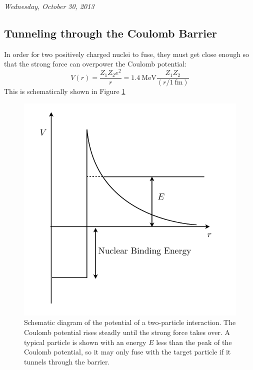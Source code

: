 \documentclass[10pt]{article}
\numberwithin{equation}{section}
\newcommand{\n}{\noindent}
\newcommand{\figref}[1]{Figure \ref{#1}}
\begin{document}
	
	\n \textit{Wednesday, October 30, 2013}
	
  \subsection{Tunneling through the Coulomb Barrier}
  \label{sec:tunn-thro-coul}

  In order for two positively charged nuclei to fuse, they must get
  close enough so that the strong force can overpower the Coulomb
  potential:
  \begin{equation}
    \label{eq:100}
    V(r)=\frac{Z_1Z_2 e^2}{r}=1.4\ \mathrm{MeV}\frac{Z_1Z_2}{(r/1\ \mathrm
{fm})}
  \end{equation}
  This is schematically shown in \figref{fig:energyPlot}
  \begin{figure}[h!]
    \centering
    \includegraphics{energyPlot.pdf}
    \caption{Schematic diagram of the potential of a two-particle
      interaction. The Coulomb potential rises steadly until the
      strong force takes over. A typical particle is
      shown with an energy $E$ less than the peak of the Coulomb
      potential, so it may only fuse with the target particle if it
      tunnels through the barrier.}
    \label{fig:energyPlot}
  \end{figure}
\end{document}
